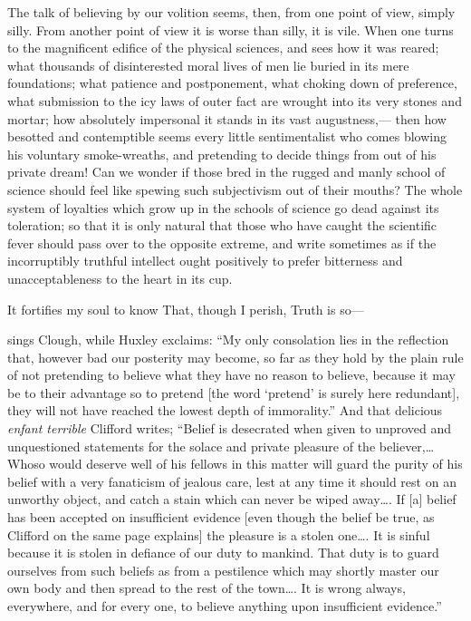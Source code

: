 \documentclass[12pt]{article}
\begin{document}

The talk of believing by our volition seems, then, from one point of view, simply silly.  From another point of view it is worse than silly, it is vile.  When one turns to the magnificent edifice of the physical sciences, and sees how it was reared; what thousands of disinterested moral lives of men lie buried in its mere foundations; what patience and postponement, what choking down of preference, what submission to the icy laws of outer fact are wrought into its very stones and mortar; how absolutely impersonal it stands in its vast augustness,--- then how besotted and contemptible seems every little sentimentalist who comes blowing his voluntary smoke-wreaths, and pretending to decide things from out of his private dream!  Can we wonder if those bred in the rugged and manly school of science should feel like spewing such subjectivism out of their mouths?  The whole system of loyalties which grow up in the schools of science go dead against its toleration; so that it is only natural that those who have caught the scientific fever should pass over to the opposite extreme, and write sometimes as if the incorruptibly truthful intellect ought positively to prefer bitterness and unacceptableness to the heart in its cup.

  It fortifies my soul to know   That, though I perish, Truth is so--- 

sings Clough, while Huxley exclaims: ``My only consolation lies in the reflection that, however bad our posterity may become, so far as they hold by the plain rule of not pretending to believe what they have no reason to believe, because it may be to their advantage so to pretend [the word `pretend' is surely here redundant], they will not have reached the  lowest depth of immorality.''  And that delicious \emph{enfant terrible} Clifford writes; ``Belief is desecrated when given to unproved and unquestioned statements for the solace and private pleasure of the believer,\ldots  Whoso would deserve well of his fellows in this matter will guard the purity of his belief with a very fanaticism of jealous care, lest at any time it should rest on an unworthy object, and catch a stain which can never be wiped away\ldots. If [a] belief has been accepted on insufficient evidence [even though the belief be true, as Clifford on the same page explains] the pleasure is a stolen one\ldots.  It is sinful because it is stolen in defiance of our duty to mankind.  That duty is to guard ourselves from such beliefs as from a pestilence which may shortly master our own body and then spread to the rest of the town\ldots.  It is wrong always, everywhere, and for every one, to believe anything upon insufficient evidence.''
\end{document}
